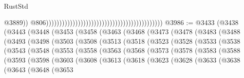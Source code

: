 \begin{lexlean}{RustStd}
\begin{coremodule}
                                                                                                @3889))
                                                                                            @806))))))))))))))))))))))))))))))))))))))))))))
@3986 := @3433
    (@3438
      (@3443
        (@3448
          (@3453
            (@3458
              (@3463
                (@3468
                  (@3473
                    (@3478
                      (@3483
                        (@3488
                          (@3493
                            (@3498
                              (@3503
                                (@3508
                                  (@3513
                                    (@3518
                                      (@3523
                                        (@3528
                                          (@3533
                                            (@3538
                                              (@3543
                                                (@3548
                                                  (@3553
                                                    (@3558
                                                      (@3563
                                                        (@3568
                                                          (@3573
                                                            (@3578
                                                              (@3583
                                                                (@3588
                                                                  (@3593
                                                                    (@3598
                                                                      (@3603
                                                                        (@3608
                                                                          (@3613
                                                                            (@3618
                                                                              (@3623
                                                                                (@3628
                                                                                  (@3633
                                                                                    (@3638
                                                                                      (@3643
                                                                                        (@3648
                                                                                          (@3653

\end{coremodule}
\end{lexlean}
